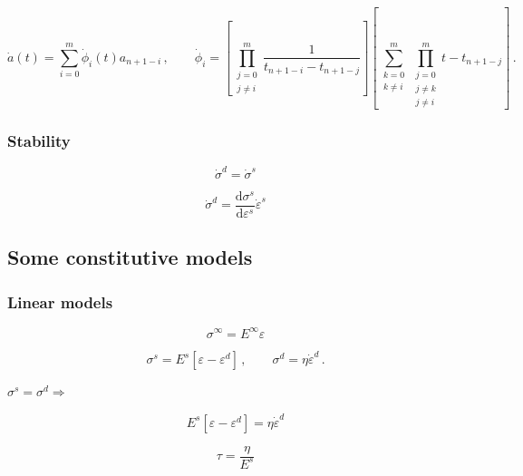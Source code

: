 \documentclass[12pt]{article}
\newcommand{\der}[2]{\dfrac{\text{d} #1}{\text{d} #2}}
\begin{document}
\begin{equation}
	\dot{a}\left(t\right) = \sum_{i=0}^{m}\dot{\phi}_{i}\left(t\right)a_{n+1-i}\,, \qquad \dot{\phi}_{i} = \left[\prod_{\substack{j=0\\ j\neq i}}^{m}\dfrac{1}{t_{n+1-i} - t_{n+1-j}}\right]\left[\sum_{\substack{k=0\\ k\neq i}}^{m}\prod_{\substack{j=0\\ j\neq k\\j\neq i}}^{m} t - t_{n+1-j}\right]\,.
\end{equation}

\subsubsection{Stability}

\begin{equation}
	\dot{\sigma}^{d} = \dot{\sigma}^{s}
\end{equation}

\begin{equation}
	\dot{\sigma}^{d} = \der{\sigma^{s}}{\varepsilon^{s}}\dot{\varepsilon}^{s}
\end{equation}

\subsection{Some constitutive models}

\subsubsection{Linear models}

\begin{equation}
	\sigma^{\infty} = E^{\infty}\varepsilon
\end{equation}

\begin{equation}
	\sigma^{s} = E^{s}\left[\varepsilon-\varepsilon^{d}\right]\,, \qquad \sigma^{d} = \eta \dot{\varepsilon}^{d}\,.
\end{equation}

$\sigma^{s} = \sigma^{d} \Rightarrow$

\begin{equation}
	E^{s}\left[\varepsilon-\varepsilon^{d}\right] = \eta \dot{\varepsilon}^{d}
\end{equation}

\begin{equation}
	\tau = \dfrac{\eta}{E^{s}}
\end{equation}
\end{document}
